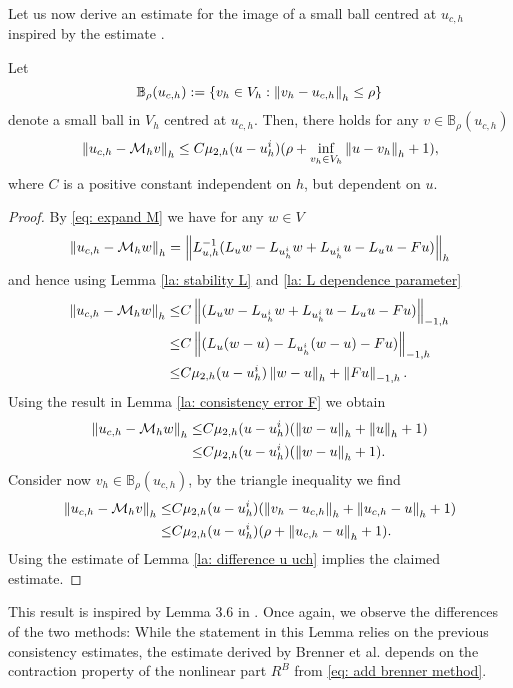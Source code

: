 Let us now derive an estimate for the image of a small ball centred at $u_{c,h}$ inspired by the estimate \cite[Lemma 3.6]{BGN+2011}.
\begin{lemma} \label{la: mapping property of M}
	Let 
	\[
		\mathbb B_\rho(u_{c,h}):=\{v_h \in V_h: \left\lVert v_h - u_{c,h} \right\rVert_{h} \leq \rho\}
	\]
	denote a small ball in $V_h$ centred at $u_{c,h}$. 
	Then, there holds for any $v \in \mathbb B_\rho(u_{c,h})$
	\[
		\left\lVert u_{c,h} - \mathcal M_h v \right\rVert_{h} \leq C \mu_{2,h}(u - u^i_h) (\rho+ \inf_{v_h \in V_h} \left\lVert u-v_h \right\rVert_{h}+1),
	\]
	where $C$ is a positive constant independent on $h$, but dependent on $u$.
\end{lemma}
\begin{proof}
By \eqref{eq: expand M} we have for any $w \in V$
	\begin{align}
		\left\lVert u_{c,h} - \mathcal M_h w \right\rVert_{h} = \left\lVert L_{u,h}^{-1}(L_u w - L_{u^i_h} w + L_{u^i_h}u - L_u u - Fu) \right\rVert_{h}
	\end{align}
	and hence using Lemma \ref{la: stability L} and \ref{la: L dependence parameter}
	\begin{align*}
		\left\lVert u_{c,h} - \mathcal M_h w \right\rVert_{h} 
		\leq& C\left\lVert (L_u w - L_{u^i_h} w + L_{u^i_h} u- L_u u - Fu) \right\rVert_{-1,h} \nonumber\\
		\leq& C\left\lVert (L_u (w-u) - L_{u^i_h} (w-u) - Fu) \right\rVert_{-1,h} \nonumber\\
				\leq& C \mu_{2,h}(u - u^i_h) \left\lVert w-u \right\rVert_{h} +\left\lVert Fu \right\rVert_{-1,h}.
	\end{align*}
	Using the result in Lemma \ref{la: consistency error F} we obtain
	\begin{align*}
		\left\lVert u_{c,h} - \mathcal M_h w \right\rVert_{h} \leq& C \mu_{2,h}(u - u^i_h) (\left\lVert w-u \right\rVert_{h}+\left\lVert u \right\rVert_{h} +1)\nonumber \\
		\leq & C \mu_{2,h}(u - u^i_h) (\left\lVert w-u \right\rVert_{h}+1).
	\end{align*}
	Consider now $v_h \in \mathbb B_\rho(u_{c,h})$, by the triangle inequality we find 
	\begin{align}
		\left\lVert u_{c,h} - \mathcal M_h v \right\rVert_{h} 
			\leq& C \mu_{2,h}(u - u^i_h) (\left\lVert v_h-u_{c,h} \right\rVert_{h}+ \left\lVert u_{c,h}-u \right\rVert_{h} +1) \nonumber \\
			\leq& C \mu_{2,h}(u - u^i_h) (\rho+ \left\lVert u_{c,h}-u \right\rVert_{h} +1).
	\end{align}
Using the estimate of Lemma \ref{la: difference u uch} implies the claimed estimate.
\end{proof}

This result is inspired by Lemma 3.6 in \cite{BGN+2011}. Once again, we observe the differences of the two methods: While the statement in this Lemma relies on the previous consistency estimates, the estimate derived by Brenner et al. depends on the contraction property of the nonlinear part $R^B$ from \eqref{eq: add brenner method}. 

